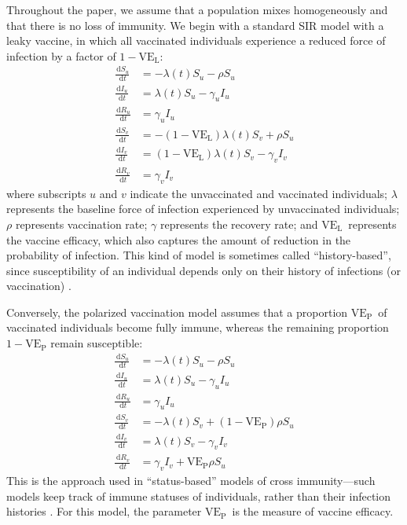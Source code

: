 \documentclass[12pt]{article}
\newcommand{\dd}[1]{\ensuremath{\, \mathrm{d}#1}}
\newcommand{\VE}{\ensuremath{\mathrm{VE}}}
\newcommand{\VEP}{\ensuremath{\VE_{\mathrm{P}}}}
\newcommand{\VEL}{\ensuremath{\VE_{\mathrm{L}}}}
\begin{document}
Throughout the paper, we assume that a population mixes homogeneously and that there is no loss of immunity.
We begin with a standard SIR model with a leaky vaccine, in which all vaccinated individuals experience a reduced force of infection by a factor of $1-\VEL$:
\begin{align}
\frac{\dd S_u}{\dd t} &= - \lambda(t) S_u - \rho S_u \\
\frac{\dd I_u}{\dd t} &= \lambda(t) S_u - \gamma_u I_u \\
\frac{\dd R_u}{\dd t} &= \gamma_u I_u \\
\frac{\dd S_v}{\dd t} &= - (1-\VEL) \lambda(t) S_v + \rho S_u \\
\frac{\dd I_v}{\dd t} &= (1-\VEL) \lambda(t) S_v - \gamma_v I_v \\
\frac{\dd R_v}{\dd t} &= \gamma_v I_v
\end{align}
where subscripts $u$ and $v$ indicate the unvaccinated and vaccinated individuals;
$\lambda$ represents the baseline force of infection experienced by unvaccinated individuals; 
$\rho$ represents vaccination rate;
$\gamma$ represents the recovery rate;
and \VEL\ represents the vaccine efficacy, which also captures the amount of reduction in the probability of infection.
This kind of model is sometimes called “history-based”, since susceptibility of an individual depends only on their history of infections (or vaccination) \citep{gog2002dynamics,gog2002status,kucharski2016capturing}.

Conversely, the polarized vaccination model assumes that a proportion \VEP\ of vaccinated individuals become fully immune, whereas the remaining proportion $1-\VEP$ remain susceptible: 
\begin{align}
\frac{\dd S_u}{\dd t} &= - \lambda(t) S_u - \rho S_u \\
\frac{\dd I_u}{\dd t} &= \lambda(t) S_u - \gamma_u I_u \\
\frac{\dd R_u}{\dd t} &= \gamma_u I_u \\
\frac{\dd S_v}{\dd t} &= - \lambda(t) S_v + (1-\VEP) \rho S_u \\
\frac{\dd I_v}{\dd t} &= \lambda(t) S_v - \gamma_v I_v \\
\frac{\dd R_v}{\dd t} &= \gamma_v I_v + \VEP \rho S_u
\end{align}
This is the approach used in “status-based” models of cross immunity---such models keep track of immune statuses of individuals, rather than their infection histories \citep{gog2002dynamics,gog2002status,kucharski2016capturing}.
For this model, the parameter \VEP\ is the measure of vaccine efficacy.
\end{document}
